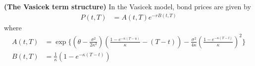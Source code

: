  \begin{proposition}
     \label{prop 5}
     \textbf{(The Vasicek term structure)} In the Vasicek model, bond prices are given by
  \begin{align}
     P(t,T) &= A(t,T) e^{-rB(t,T)} 
 \end{align}
 where
 \begin{align*}
     A(t,T)&= \exp \Biggl\{\left(\theta-\frac{\sigma^2}{2 \kappa^2}\right)\left(\frac{1-e^{-\kappa(T-u)}}{\kappa}-(T-t)\right)
     -\frac{\sigma^2}{4 \kappa}\left(\frac{1-e^{-\kappa(T-t)}}{\kappa}\right)^2 \Biggr\} \\
     B(t,T) & =\frac{1}{\kappa} \left( 1 - e^{-\kappa (T-t)} \right)  
 \end{align*}
 \cite{Bjork}
 \end{proposition}

    